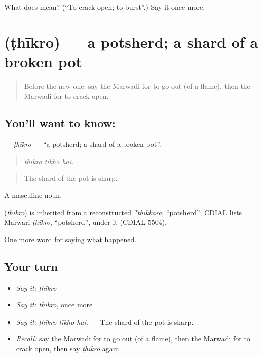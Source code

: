 \begin{tcolorbox}[breakable,colback=teal!4,colframe=teal!35!black,title={Before you move on}]
What does  mean? (\textquotedblleft{}To crack open; to burst\textquotedblright{}.) Say it once more.
\end{tcolorbox}
\section[\texorpdfstring{\mw{ठीकरो} (ṭhīkro)}{ठीकरो (ṭhīkro)}]{ (ṭhīkro) — a potsherd; a shard of a broken pot}

\label{lesson:MW-C242-thikro}



\begin{quote}
Before the new one: say the Marwadi for to go out (of a flame), then the Marwadi for to crack open.
\end{quote}

\subsection*{You'll want to know: }
\textbf{} — \emph{ṭhīkro} — \textquotedblleft{}a potsherd; a shard of a broken pot\textquotedblright{}.

\begin{quote}
  
\end{quote}

\begin{quote}
\emph{ṭhīkro tīkho hai.}
\end{quote}

\begin{quote}
The shard of the pot is sharp.
\end{quote}

A masculine noun.

\begin{cousinweb}
\textbf{} (\emph{ṭhīkro}) is inherited from a reconstructed \emph{*ṭhīkkara}, \textquotedblleft{}potsherd\textquotedblright{}; CDIAL lists Marwari \emph{ṭhīkro}, \textquotedblleft{}potsherd\textquotedblright{}, under it (CDIAL 5504).
\end{cousinweb}

\begin{grammarlens}[title={What you've built}]
One more word for saying what happened.
\end{grammarlens}

\subsection*{Your turn}
\begin{itemize}
\raggedright
  \item \emph{Say it:} \emph{ṭhīkro}
  \item \emph{Say it:} \emph{ṭhīkro}, once more
  \item \emph{Say it:} \emph{ṭhīkro tīkho hai.} — The shard of the pot is sharp.
  \item \emph{Recall:} say the Marwadi for to go out (of a flame), then the Marwadi for to crack open, then say \emph{ṭhīkro} again
\end{itemize}

